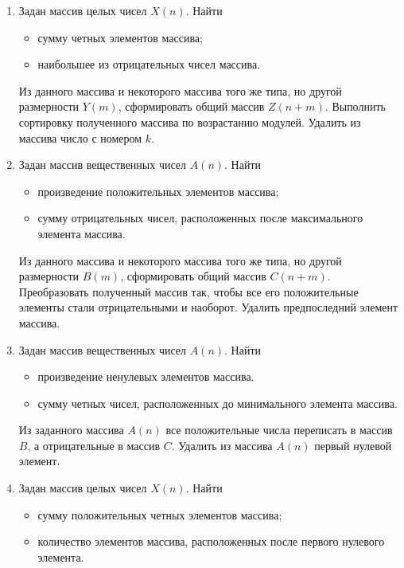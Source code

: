 \begin{enumerate}
\item Задан массив целых чисел $X(n)$. Найти
\begin{itemize}
\item сумму четных элементов массива;
\item наибольшее из отрицательных чисел массива.
\end{itemize}

Из данного массива и некоторого массива того же типа, но другой размерности $Y(m)$,
сформировать общий массив $Z(n+m)$. Выполнить сортировку полученного массива по
возрастанию модулей. Удалить из массива число с номером $k$.
\item Задан массив вещественных чисел $A(n)$. Найти 
\begin{itemize}
\item произведение положительных элементов массива;
\item сумму отрицательных чисел, расположенных после максимального элемента массива.
\end{itemize}

Из данного массива и некоторого массива того же типа, но другой размерности $B(m)$,
сформировать общий массив $C(n+m)$. Преобразовать полученный массив так, чтобы все
его положительные элементы стали отрицательными и наоборот. Удалить предпоследний элемент массива.
\item Задан массив вещественных чисел $A(n)$. Найти
\begin{itemize}
\item произведение ненулевых элементов массива.
\item сумму четных чисел, расположенных до минимального элемента массива.
\end{itemize}

Из заданного массива $A(n)$ все положительные числа переписать в массив $B$, а
отрицательные в массив $C$. Удалить из массива $A(n)$ первый нулевой элемент.

\item Задан массив целых чисел $X(n)$. Найти
\begin{itemize}
\item сумму положительных четных элементов массива;
\item количество элементов массива, расположенных после первого нулевого элемента.
\end{itemize}


\end{enumerate}
